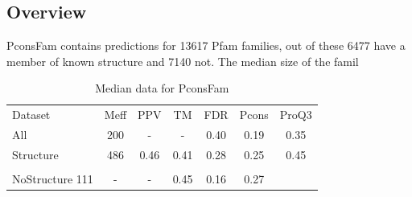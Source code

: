 \documentclass[a4,center,fleqn]{NAR}
\begin{document}
\subsection{Overview}

PconsFam contains predictions for 13617 Pfam families, out of these
6477 have a member of known structure and  7140 not.  The median size
of the famil

\begin{table}
\begin{tabular}{lcccccc}
Dataset & Meff & PPV & TM & FDR & Pcons & ProQ3\\   
All  &  200 & - & - & 0.40 & 0.19 & 0.35\\
Structure &  486 &  0.46 & 0.41 & 0.28 & 0.25 & 0.45\\ \\
NoStructure  111 & - & - & 0.45 & 0.16 & 0.27 \\
\end{tabular}
\caption{Median data for PconsFam}
\label{tab:summary}
\end{table}

\iffalse
\end{document}
